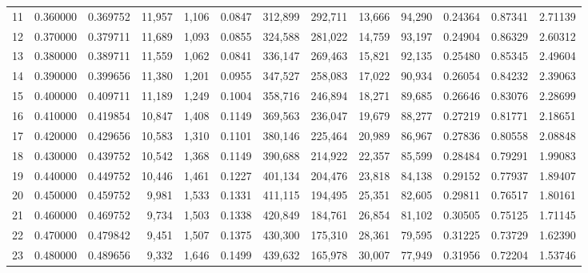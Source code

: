\begin{tabular}{rrrrrrrrrrrrr}
11 &  0.360000 &  0.369752 &  11,957 &  1,106 &                                     0.0847 &  312,899 &  292,711 &   13,666 &   94,290 &  0.24364 &  0.87341 &  2.71139 \\
12 &  0.370000 &  0.379711 &  11,689 &  1,093 &                                     0.0855 &  324,588 &  281,022 &   14,759 &   93,197 &  0.24904 &  0.86329 &  2.60312 \\
13 &  0.380000 &  0.389711 &  11,559 &  1,062 &                                     0.0841 &  336,147 &  269,463 &   15,821 &   92,135 &  0.25480 &  0.85345 &  2.49604 \\
14 &  0.390000 &  0.399656 &  11,380 &  1,201 &                                     0.0955 &  347,527 &  258,083 &   17,022 &   90,934 &  0.26054 &  0.84232 &  2.39063 \\
15 &  0.400000 &  0.409711 &  11,189 &  1,249 &                                     0.1004 &  358,716 &  246,894 &   18,271 &   89,685 &  0.26646 &  0.83076 &  2.28699 \\
16 &  0.410000 &  0.419854 &  10,847 &  1,408 &                                     0.1149 &  369,563 &  236,047 &   19,679 &   88,277 &  0.27219 &  0.81771 &  2.18651 \\
17 &  0.420000 &  0.429656 &  10,583 &  1,310 &                                     0.1101 &  380,146 &  225,464 &   20,989 &   86,967 &  0.27836 &  0.80558 &  2.08848 \\
18 &  0.430000 &  0.439752 &  10,542 &  1,368 &                                     0.1149 &  390,688 &  214,922 &   22,357 &   85,599 &  0.28484 &  0.79291 &  1.99083 \\
19 &  0.440000 &  0.449752 &  10,446 &  1,461 &                                     0.1227 &  401,134 &  204,476 &   23,818 &   84,138 &  0.29152 &  0.77937 &  1.89407 \\
20 &  0.450000 &  0.459752 &   9,981 &  1,533 &                                     0.1331 &  411,115 &  194,495 &   25,351 &   82,605 &  0.29811 &  0.76517 &  1.80161 \\
21 &  0.460000 &  0.469752 &   9,734 &  1,503 &                                     0.1338 &  420,849 &  184,761 &   26,854 &   81,102 &  0.30505 &  0.75125 &  1.71145 \\
22 &  0.470000 &  0.479842 &   9,451 &  1,507 &                                     0.1375 &  430,300 &  175,310 &   28,361 &   79,595 &  0.31225 &  0.73729 &  1.62390 \\
23 &  0.480000 &  0.489656 &   9,332 &  1,646 &                                     0.1499 &  439,632 &  165,978 &   30,007 &   77,949 &  0.31956 &  0.72204 &  1.53746 \\

\end{tabular}
